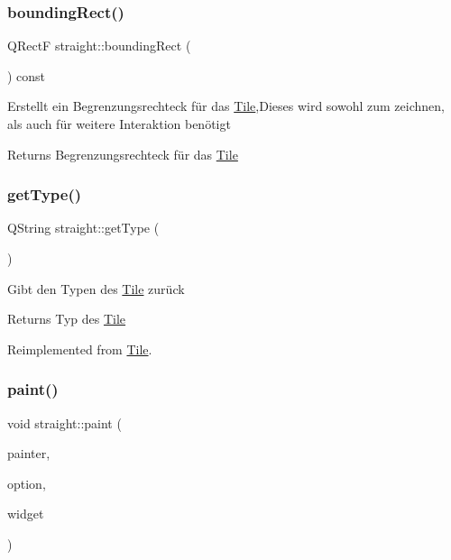 \subsubsection{\texorpdfstring{bounding\+Rect()}{boundingRect()}}
{\footnotesize\ttfamily Q\+RectF straight\+::bounding\+Rect (\begin{DoxyParamCaption}{ }\end{DoxyParamCaption}) const}

Erstellt ein Begrenzungsrechteck für das \mbox{\hyperlink{class_tile}{Tile}},Dieses wird sowohl zum zeichnen, als auch für weitere Interaktion benötigt \begin{DoxyReturn}{Returns}
Begrenzungsrechteck für das \mbox{\hyperlink{class_tile}{Tile}} 
\end{DoxyReturn}
\mbox{\label{classstraight_a50f5861f414dc03aa4e8947945abcd9e}} 
\subsubsection{\texorpdfstring{get\+Type()}{getType()}}
{\footnotesize\ttfamily Q\+String straight\+::get\+Type (\begin{DoxyParamCaption}{ }\end{DoxyParamCaption})\hspace{0.3cm}{\ttfamily [virtual]}}

Gibt den Typen des \mbox{\hyperlink{class_tile}{Tile}} zurück \begin{DoxyReturn}{Returns}
Typ des \mbox{\hyperlink{class_tile}{Tile}} 
\end{DoxyReturn}


Reimplemented from \mbox{\hyperlink{class_tile_ad1dbea94d96060491a2dc4c7b92b31ab}{Tile}}.

\mbox{\label{classstraight_a324505038865a61ebe65542e29e7575a}} 
\subsubsection{\texorpdfstring{paint()}{paint()}}
{\footnotesize\ttfamily void straight\+::paint (\begin{DoxyParamCaption}\item[{Q\+Painter $\ast$}]{painter,  }\item[{const Q\+Style\+Option\+Graphics\+Item $\ast$}]{option,  }\item[{Q\+Widget $\ast$}]{widget }\end{DoxyParamCaption})\hspace{0.3cm}{\ttfamily [virtual]}}

